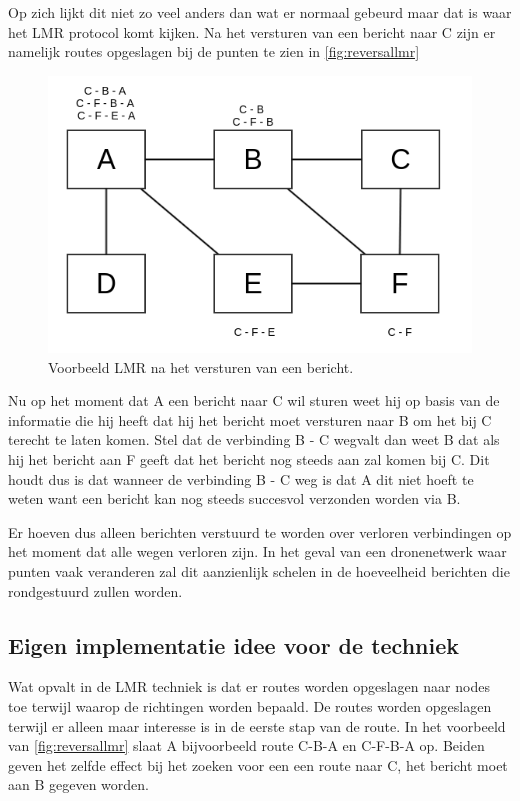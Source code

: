\documentclass[a4paper, 11pt, oneside]{report}
\begin{document}
Op zich lijkt dit niet zo veel anders dan wat er normaal gebeurd maar dat is waar het LMR protocol komt kijken.
Na het versturen van een bericht naar C zijn er namelijk routes opgeslagen bij de punten te zien in \autoref{fig:reversallmr}

\begin{figure}[H]
	\begin{center}\includegraphics[width=0.5\linewidth]{Afbeeldingen/reversal-table.png}\end{center}
	\caption{Voorbeeld LMR na het versturen van een bericht.}
	\label{fig:reversallmr}
\end{figure} 

Nu op het moment dat A een bericht naar C wil sturen weet hij op basis van de informatie die hij heeft dat hij het bericht moet versturen naar B om het bij C terecht te laten komen.
Stel dat de verbinding B - C wegvalt dan weet B dat als hij het bericht aan F geeft dat het bericht nog steeds aan zal komen bij C.
Dit houdt dus is dat wanneer de verbinding B - C weg is dat A dit niet hoeft te weten want een bericht kan nog steeds succesvol verzonden worden via B.

Er hoeven dus alleen berichten verstuurd te worden over verloren verbindingen op het moment dat alle wegen verloren zijn.
In het geval van een dronenetwerk waar punten vaak veranderen zal dit aanzienlijk schelen in de hoeveelheid berichten die rondgestuurd zullen worden.

\subsection{Eigen implementatie idee voor de techniek}

Wat opvalt in de LMR techniek is dat er routes worden opgeslagen naar nodes toe terwijl waarop de richtingen worden bepaald.
De routes worden opgeslagen terwijl er alleen maar interesse is in de eerste stap van de route. 
In het voorbeeld van \autoref{fig:reversallmr} slaat A bijvoorbeeld route C-B-A en C-F-B-A op. 
Beiden geven het zelfde effect bij het zoeken voor een een route naar C, het bericht moet aan B gegeven worden.
\end{document}
